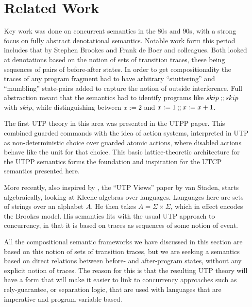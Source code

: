 \section{Related Work}\label{sec:related}

Key work was done on concurrent semantics in the 80s and 90s,
with a strong focus on fully abstract denotational
semantics.
Notable work form this period includes that by
Stephen Brookes\cite{DBLP:journals/iandc/Brookes96}
and Frank de Boer and colleagues\cite{DBLP:conf/concur/BoerKPR91}.
Both looked at denotations based on the notion of sets of transition traces,
these being sequences of pairs of before-after states.
In order to get compositionality the traces of any program fragment
had to have arbitrary ``stuttering'' and ``mumbling'' state-pairs
added to capture the notion of outside interference.
Full abstraction meant that the semantics had to identify
programs like $skip\mathbin{;\!;} skip$ with $skip$,
while distinguishing between $x:=2$ and $x:=1\mathbin{;\!;} x:=x+1$.

The first UTP theory in this area was presented in
the UTPP paper\cite{DBLP:conf/icfem/WoodcockH02}.
This combined guarded commands\cite{1976:book:dijkstra}
with the idea of action systems\cite{PODC::BackK1983},
interpreted in UTP as non-deterministic choice
over guarded atomic actions,
where disabled actions behave like the unit for that choice.
This basic lattice-theoretic architecture for the UTPP semantics
forms the foundation and inspiration for the UTCP semantics presented here.

More recently, also inspired by \cite{conf/popl/Dinsdale-YoungBGPY13},
the  ``UTP Views'' paper by van Staden\cite{DBLP:conf/utp/Staden14},
starts algebraically, looking at Kleene algebras over languages.
Languages here are sets of strings over an alphabet $A$.
He then takes $A =\Sigma\times\Sigma$,
which in effect encodes the Brookes model\cite{DBLP:journals/iandc/Brookes96}.
His semantics fits with the usual UTP approach to concurrency,
in that it is based on traces as sequences of some notion of event.


All the compositional
semantic frameworks we have discussed in this section
are based on this notion of sets of transition traces,
but we are seeking a semantics based on direct relations
between before- and after-program states,
without any explicit notion of traces.
The reason for this is that the resulting UTP theory will have
a form that will make it easier to link to concurrency approaches
such as rely-guarantee, or separation logic, that
are used with languages that are imperative and program-variable based.

